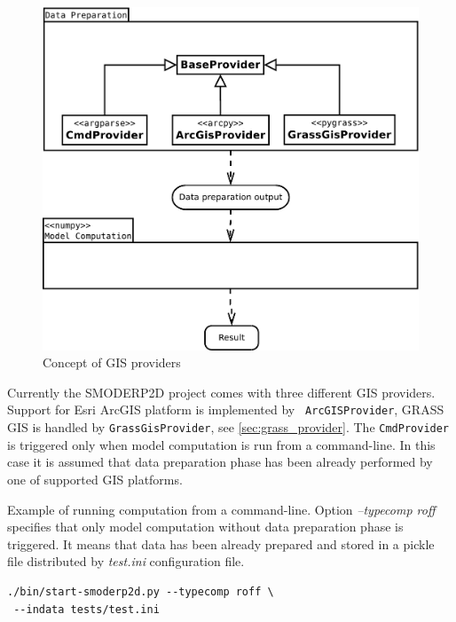 \begin{figure}[ht!]
  \begin{center}
    \includegraphics[width=1.0\columnwidth]{figures/uml_diagram.pdf}
    \caption{Concept of GIS providers}
    \label{fig:uml_diagram}
  \end{center}
\end{figure}

Currently the SMODERP2D project comes with three different GIS
providers. Support for Esri ArcGIS platform is implemented by {\tt
  ArcGISProvider}, GRASS GIS is handled by {\tt GrassGisProvider}, see
\ref{sec:grass_provider}. The {\tt CmdProvider} is triggered only when
model computation is run from a command-line. In this case it is
assumed that data preparation phase has been already performed by one
of supported GIS platforms.

Example of running computation from a command-line. Option {\it
  --typecomp roff} specifies that only model computation without data
preparation phase is triggered. It means that data has been already
prepared and stored in a pickle file distributed by {\it test.ini}
configuration file.

\begin{verbatim}
./bin/start-smoderp2d.py --typecomp roff \
 --indata tests/test.ini
\end{verbatim}

